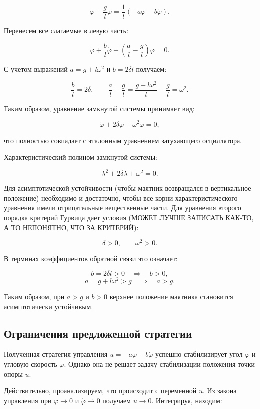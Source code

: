 \documentclass[a4paper, 12pt]{article}
\begin{document}
\[
\ddot{\varphi} - \frac{g}{l} \varphi = \frac{1}{l} (-a\varphi - b\dot{\varphi}).
\]

Перенесем все слагаемые в левую часть:

\[
\ddot{\varphi} + \frac{b}{l} \dot{\varphi} + \left( \frac{a}{l} - \frac{g}{l} \right) \varphi = 0.
\]

С учетом выражений $a = g + l\omega^2$ и $b = 2\delta l$ получаем:

\[
\frac{b}{l} = 2\delta, \qquad \frac{a}{l} - \frac{g}{l} = \frac{g + l\omega^2}{l} - \frac{g}{l} = \omega^2.
\]

Таким образом, уравнение замкнутой системы принимает вид:

\[
\ddot{\varphi} + 2\delta \dot{\varphi} + \omega^2 \varphi = 0,
\]

что полностью совпадает с эталонным уравнением затухающего осциллятора.

Характеристический полином замкнутой системы:

\[
\lambda^2 + 2\delta \lambda + \omega^2 = 0.
\]

Для асимптотической устойчивости (чтобы маятник возвращался в вертикальное положение) необходимо и достаточно, чтобы все корни характеристического уравнения имели отрицательные вещественные части. Для уравнения второго порядка критерий Гурвица дает условия (МОЖЕТ ЛУЧШЕ ЗАПИСАТЬ КАК-ТО, А ТО НЕПОНЯТНО, ЧТО ЗА КРИТЕРИЙ):

\[
\delta > 0, \qquad \omega^2 > 0.
\]

В терминах коэффициентов обратной связи это означает:

\[
b = 2\delta l > 0 \quad \Rightarrow \quad b > 0,
\]
\[
a = g + l\omega^2 > g \quad \Rightarrow \quad a > g.
\]

Таким образом, при $a > g$ и $b > 0$ верхнее положение маятника становится асимптотически устойчивым.

\subsection{ Ограничения предложенной стратегии}

Полученная стратегия управления $\ddot{u} = -a\varphi - b\dot{\varphi}$ успешно стабилизирует угол $\varphi$ и угловую скорость $\dot{\varphi}$. Однако она не решает задачу стабилизации положения точки опоры $u$.

Действительно, проанализируем, что происходит с переменной $u$. Из закона управления при $\varphi \to 0$ и $\dot{\varphi} \to 0$ получаем $\ddot{u} \to 0$. Интегрируя, находим:
\end{document}
